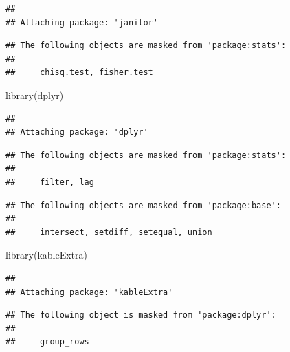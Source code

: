 \documentclass[
]{article}
\newenvironment{Shaded}{\begin{snugshade}}{\end{snugshade}}
\newcommand{\FunctionTok}[1]{\textcolor[rgb]{0.00,0.00,0.00}{#1}}
\newcommand{\NormalTok}[1]{#1}
\begin{document}
\begin{verbatim}
## 
## Attaching package: 'janitor'
\end{verbatim}

\begin{verbatim}
## The following objects are masked from 'package:stats':
## 
##     chisq.test, fisher.test
\end{verbatim}

\begin{Shaded}
\begin{Highlighting}[]
\FunctionTok{library}\NormalTok{(dplyr) }
\end{Highlighting}
\end{Shaded}

\begin{verbatim}
## 
## Attaching package: 'dplyr'
\end{verbatim}

\begin{verbatim}
## The following objects are masked from 'package:stats':
## 
##     filter, lag
\end{verbatim}

\begin{verbatim}
## The following objects are masked from 'package:base':
## 
##     intersect, setdiff, setequal, union
\end{verbatim}

\begin{Shaded}
\begin{Highlighting}[]
\FunctionTok{library}\NormalTok{(kableExtra)}
\end{Highlighting}
\end{Shaded}

\begin{verbatim}
## 
## Attaching package: 'kableExtra'
\end{verbatim}

\begin{verbatim}
## The following object is masked from 'package:dplyr':
## 
##     group_rows
\end{verbatim}
\end{document}
